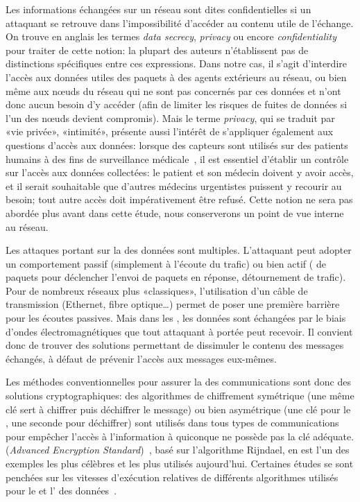 Les informations échangées sur un réseau sont dites confidentielles si un attaquant se retrouve dans l'impossibilité d'accéder au contenu utile de l'échange.
On trouve en anglais les termes \textit{data secrecy}, \textit{privacy} ou encore \textit{confidentiality} pour traiter de cette notion: la plupart des auteurs n'établissent pas de distinctions spécifiques entre ces expressions.
Dans notre cas, il s'agit d'interdire l'accès aux données utiles des paquets à des agents extérieurs au réseau, ou bien même aux nœuds du réseau qui ne sont pas concernés par ces données et n'ont donc aucun besoin d'y accéder (afin de limiter les risques de fuites de données si l'un des nœuds devient compromis).
Mais le terme \textit{privacy}, qui se traduit par «vie privée», «intimité», présente aussi l'intérêt de s'appliquer également aux questions d'accès aux données: lorsque des capteurs sont utilisés sur des patients humains à des fins de surveillance médicale~\cite{SZFDXC14}, il est essentiel d'établir un contrôle sur l'accès aux données collectées: le patient et son médecin doivent y avoir accès, et il serait souhaitable que d'autres médecins urgentistes puissent y recourir au besoin; tout autre accès doit impérativement être refusé.
Cette notion ne sera pas abordée plus avant dans cette étude, nous conserverons un point de vue interne au réseau.

Les attaques portant sur la  des données sont multiples.
L'attaquant peut adopter un comportement passif (simplement à l'écoute du trafic) ou bien actif ( de paquets pour déclencher l'envoi de paquets en réponse, détournement de trafic).
Pour de nombreux réseaux plus «classiques», l'utilisation d'un câble de transmission (Ethernet, fibre optique\dots) permet de poser une première barrière pour les écoutes passives.
Mais dans les \rcs, les données sont échangées par le biais d'ondes électromagnétiques que tout attaquant à portée peut recevoir.
Il convient donc de trouver des solutions permettant de dissimuler le contenu des messages échangés, à défaut de prévenir l'accès aux messages eux-mêmes.

Les méthodes conventionnelles pour assurer la  des communications sont donc des solutions cryptographiques: des algorithmes de chiffrement symétrique (une même clé sert à chiffrer puis déchiffrer le message) ou bien asymétrique (une clé pour le , une seconde pour déchiffrer) sont utilisés dans tous types de communications pour empêcher l'accès à l'information à quiconque ne possède pas la clé adéquate.
 (\textit{Advanced Encryption Standard})~\cite{aes}, basé sur l'algorithme Rijndael, en est l'un des exemples les plus célèbres et les plus utilisés aujourd'hui.
Certaines études se sont penchées sur les vitesses d'exécution relatives de différents algorithmes utilisés pour le  et l' des données~\cite{SOBMCN11}.

